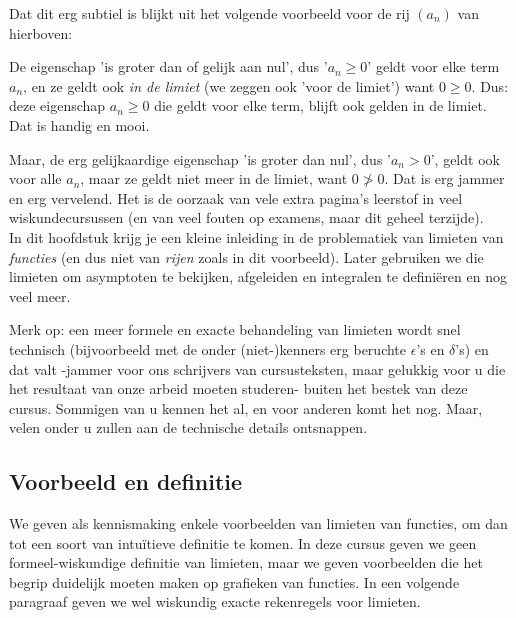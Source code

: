 \documentclass[numbers,wordchoicegiven]{ximera}
\begin{document}
\begin{expandable}
\begin{uitwijding}
Dat dit erg subtiel is blijkt uit het volgende voorbeeld voor de rij $(a_n)$ van hierboven:

De eigenschap 'is groter dan of gelijk aan nul', dus '$a_n\geq0$' geldt voor elke term $a_n$, en ze geldt ook \textit{in de limiet} (we zeggen ook 'voor de limiet') want  $0\geq0$. Dus: deze eigenschap $a_n\geq 0$ die geldt voor elke term, blijft ook gelden in de limiet. Dat is handig en mooi. 

Maar, de erg gelijkaardige eigenschap 'is groter dan nul', dus '$a_n>0$', geldt ook voor alle $a_n$, maar ze geldt niet meer in de limiet, want $0\not>0$. Dat is erg jammer en erg vervelend. Het is de oorzaak van vele extra pagina's leerstof in veel wiskundecursussen (en van veel fouten op examens, maar dit geheel terzijde). \\


In dit hoofdstuk krijg je een kleine inleiding in de problematiek van limieten van \textit{functies} (en dus niet van \textit{rijen} zoals in dit voorbeeld). Later gebruiken we die limieten om asymptoten te bekijken, afgeleiden en integralen te definiëren en nog veel meer. 

Merk op: een meer formele en exacte behandeling van limieten wordt snel technisch (bijvoorbeeld met de onder (niet-)kenners erg beruchte $\epsilon$'s en $\delta$'s) en dat valt -jammer voor ons schrijvers van cursusteksten, maar gelukkig voor u die het resultaat van onze arbeid moeten studeren- buiten het bestek van deze cursus. Sommigen van u kennen het al, en voor anderen komt het nog. Maar, velen onder u zullen aan de technische details ontsnappen.
\end{uitwijding}
\end{expandable}


\subsection{Voorbeeld en definitie}

We geven als kennismaking enkele voorbeelden van limieten van functies, om dan tot een soort van intuïtieve definitie te komen. In  deze cursus geven we geen formeel-wiskundige definitie van limieten, maar we geven voorbeelden die het begrip duidelijk moeten maken op grafieken van functies. In een volgende paragraaf geven we wel wiskundig exacte rekenregels voor limieten.

\end{document}
